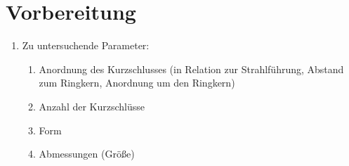 \section{Vorbereitung}
    \begin{enumerate}
        \item Zu untersuchende Parameter:
            \begin{enumerate}
                \item Anordnung des Kurzschlusses (in Relation zur Strahlführung, Abstand zum Ringkern, Anordnung um den Ringkern)
                \item Anzahl der Kurzschlüsse
                \item Form
                \item Abmessungen (Größe)
            \end{enumerate}
    \end{enumerate}